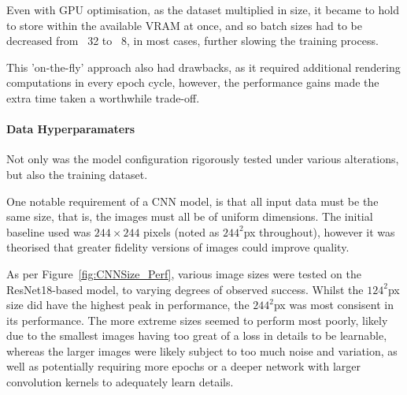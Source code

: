                         Even with GPU optimisation, as the dataset multiplied in size, it became to hold to store within the available VRAM at once, and so batch sizes had to be decreased from ~32 to ~8, in most cases, further slowing the training process.
    
                        This 'on-the-fly' approach also had drawbacks, as it required additional rendering computations in every epoch cycle, however, the performance gains made the extra time taken a worthwhile trade-off.
        
                    \paragraph{Data Hyperparamaters}
    
                        Not only was the model configuration rigorously tested under various alterations, but also the training dataset.
    
                        One notable requirement of a CNN model, is that all input data must be the same size, that is, the images must all be of uniform dimensions. The initial baseline used was \(244×244\) pixels (noted as \(244^2\)px throughout), however it was theorised that greater fidelity versions of images could improve quality.
    
                        As per Figure~\ref{fig:CNNSize_Perf}, various image sizes were tested on the ResNet18-based model, to varying degrees of observed success. Whilst the \(124^2\)px size did have the highest peak in performance, the \(244^2\)px was most consisent in its performance. The more extreme sizes seemed to perform most poorly, likely due to the smallest images having too great of a loss in details to be learnable, whereas the larger images were likely subject to too much noise and variation, as well as potentially requiring more epochs or a deeper network with larger convolution kernels to adequately learn details.
            
